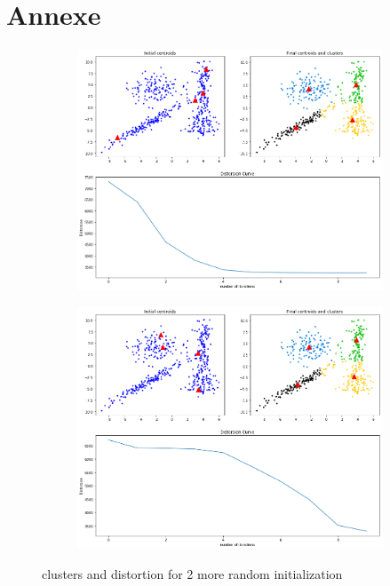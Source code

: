 \documentclass[11pt]{article}
\numberwithin{figure}{section} %
\begin{document}
\section{Annexe}

\begin{figure}[H]
\centering
	\begin{subfigure}[b]{.75\textwidth}
		\centering
		\includegraphics[width=1\linewidth]{images/kmeans_2.png}
		\label{fig:kmeansa}
	\end{subfigure}
	\begin{subfigure}[b]{.75\textwidth}
		\centering
		\includegraphics[width=1\linewidth]{images/kmeans_3.png}
		\label{fig:kmeansb}
	\end{subfigure}
\caption{clusters and distortion for 2 more random initialization}
\label{fig:kmeans2}
\end{figure}
\end{document}
